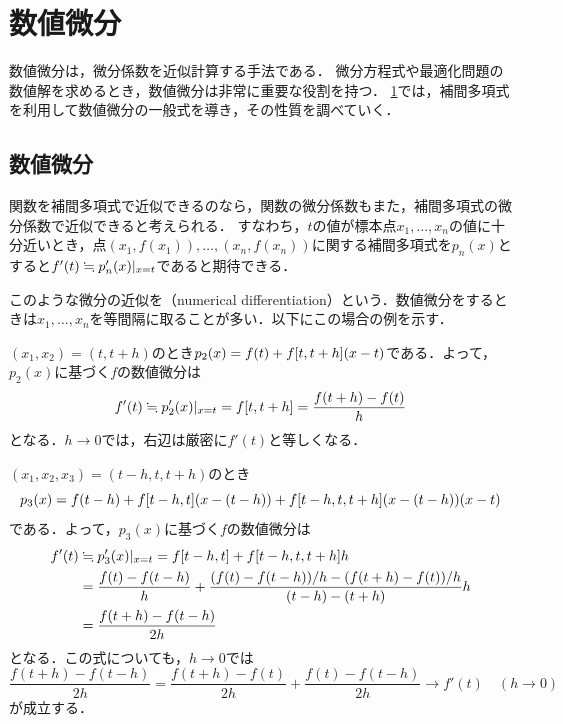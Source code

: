 \documentclass[../../main]{subfiles}
\begin{document}
\chapter{数値微分}
\label{chapter:numerical_differentiation}
\begin{lead}
数値微分は，微分係数を近似計算する手法である．
微分方程式や最適化問題の数値解を求めるとき，数値微分は非常に重要な役割を持つ．
\cref{chapter:numerical_differentiation}では，補間多項式を利用して数値微分の一般式を導き，その性質を調べていく．
\end{lead}

\section{数値微分}
関数を補間多項式で近似できるのなら，関数の微分係数もまた，補間多項式の微分係数で近似できると考えられる．
すなわち，\(t\)の値が標本点\(x_1,\dots,x_n\)の値に十分近いとき，点\((x_1,f(x_1)),\dots,(x_n,f(x_n))\)に関する補間多項式を\(p_n(x)\)とすると\(f'(t)\fallingdotseq\eval{p_n'(x)}_{x=t}\)であると期待できる．

このような微分の近似を（numerical differentiation）という．数値微分をするときは\(x_1,\dots,x_n\)を等間隔に取ることが多い．以下にこの場合の例を示す．

\begin{example}
\label{example:numerical_derivative_1}
\((x_1,x_2)=(t,t+h)\)のとき\(p_2(x)=f(t)+\divdiff[f]{t,t+h}(x-t)\)である．よって，\(p_2(x)\)に基づく\(f\)の数値微分は
\[
  f'(t) \fallingdotseq \eval{p_2'(x)}_{x=t}
  = \divdiff[f]{t,t+h}
  = \frac{f(t+h)-f(t)}{h}
\]
となる．\(h\to 0\)では，右辺は厳密に\(f'(t)\)と等しくなる．
\end{example}

\begin{example}
\label{example:numerical_derivative_2}
\((x_1,x_2,x_3)=(t-h,t,t+h)\)のとき
\[
  p_3(x) = f(t-h)+\divdiff[f]{t-h,t}\pqty*{x-(t-h)}+\divdiff[f]{t-h,t,t+h}\pqty*{x-(t-h)}(x-t)
\]
である．よって，\(p_3(x)\)に基づく\(f\)の数値微分は
\begin{align*}
  f'(t) &\fallingdotseq \eval{p_3'(x)}_{x=t} = \divdiff[f]{t-h,t}+\divdiff[f]{t-h,t,t+h}h \\
  &= \frac{f(t)-f(t-h)}{h}+\frac{(f(t)-f(t-h))/h-(f(t+h)-f(t))/h}{(t-h)-(t+h)}h \\
  &= \frac{f(t+h)-f(t-h)}{2h}  
\end{align*}
となる．この式についても，\(h\to 0\)では
\[
  \frac{f(t+h)-f(t-h)}{2h} = \frac{f(t+h)-f(t)}{2h}+\frac{f(t)-f(t-h)}{2h}
  \to f'(t)\quad(h\to 0)
\]
が成立する．
\end{example}
\end{document}
